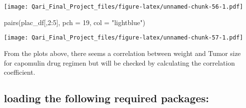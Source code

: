 \documentclass[
]{article}
\newenvironment{Shaded}{\begin{snugshade}}{\end{snugshade}}
\newcommand{\AttributeTok}[1]{\textcolor[rgb]{0.77,0.63,0.00}{#1}}
\newcommand{\CommentTok}[1]{\textcolor[rgb]{0.56,0.35,0.01}{\textit{#1}}}
\newcommand{\DecValTok}[1]{\textcolor[rgb]{0.00,0.00,0.81}{#1}}
\newcommand{\FunctionTok}[1]{\textcolor[rgb]{0.00,0.00,0.00}{#1}}
\newcommand{\NormalTok}[1]{#1}
\newcommand{\SpecialCharTok}[1]{\textcolor[rgb]{0.00,0.00,0.00}{#1}}
\newcommand{\StringTok}[1]{\textcolor[rgb]{0.31,0.60,0.02}{#1}}
\begin{document}
\begin{Shaded}
\end{Shaded}

\texttt{[image: Qari\_Final\_Project\_files/figure-latex/unnamed-chunk-56-1.pdf]}

\begin{Shaded}
\begin{Highlighting}[]
\FunctionTok{pairs}\NormalTok{(plac\_df[,}\DecValTok{2}\SpecialCharTok{:}\DecValTok{5}\NormalTok{], }\AttributeTok{pch =} \DecValTok{19}\NormalTok{, }\AttributeTok{col =} \StringTok{"lightblue"}\NormalTok{)}
\end{Highlighting}
\end{Shaded}

\texttt{[image: Qari\_Final\_Project\_files/figure-latex/unnamed-chunk-57-1.pdf]}

From the plots above, there seems a correlation between weight and Tumor
size for capomulin drug regimen but will be checked by calculating the
correlation coefficient.

\hypertarget{loading-the-following-required-packages}{%
\subsection{loading the following required
packages:}\label{loading-the-following-required-packages}}
\end{document}
